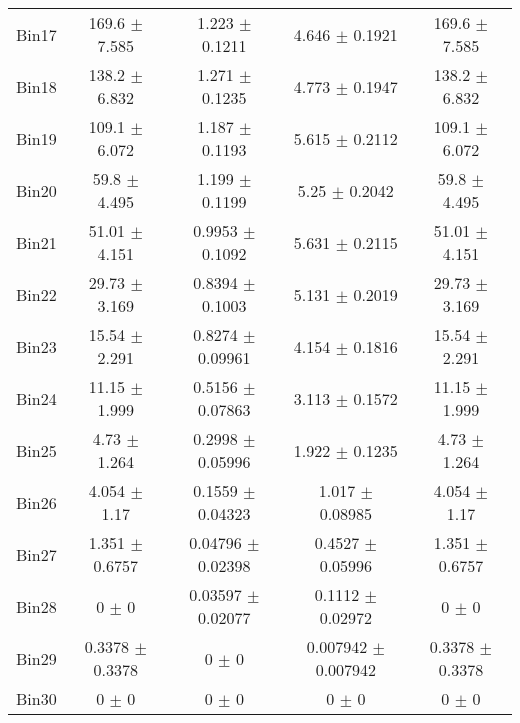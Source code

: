 \begin{tabular}{@{\extracolsep{4pt}}lcccc@{}}
     Bin17 & 169.6 $\pm$ 7.585 & 1.223 $\pm$ 0.1211 & 4.646 $\pm$ 0.1921 & 169.6 $\pm$ 7.585 \\ 
     Bin18 & 138.2 $\pm$ 6.832 & 1.271 $\pm$ 0.1235 & 4.773 $\pm$ 0.1947 & 138.2 $\pm$ 6.832 \\ 
     Bin19 & 109.1 $\pm$ 6.072 & 1.187 $\pm$ 0.1193 & 5.615 $\pm$ 0.2112 & 109.1 $\pm$ 6.072 \\ 
     Bin20 & 59.8 $\pm$ 4.495 & 1.199 $\pm$ 0.1199 & 5.25 $\pm$ 0.2042 & 59.8 $\pm$ 4.495 \\ 
     Bin21 & 51.01 $\pm$ 4.151 & 0.9953 $\pm$ 0.1092 & 5.631 $\pm$ 0.2115 & 51.01 $\pm$ 4.151 \\ 
     Bin22 & 29.73 $\pm$ 3.169 & 0.8394 $\pm$ 0.1003 & 5.131 $\pm$ 0.2019 & 29.73 $\pm$ 3.169 \\ 
     Bin23 & 15.54 $\pm$ 2.291 & 0.8274 $\pm$ 0.09961 & 4.154 $\pm$ 0.1816 & 15.54 $\pm$ 2.291 \\ 
     Bin24 & 11.15 $\pm$ 1.999 & 0.5156 $\pm$ 0.07863 & 3.113 $\pm$ 0.1572 & 11.15 $\pm$ 1.999 \\ 
     Bin25 & 4.73 $\pm$ 1.264 & 0.2998 $\pm$ 0.05996 & 1.922 $\pm$ 0.1235 & 4.73 $\pm$ 1.264 \\ 
     Bin26 & 4.054 $\pm$ 1.17 & 0.1559 $\pm$ 0.04323 & 1.017 $\pm$ 0.08985 & 4.054 $\pm$ 1.17 \\ 
     Bin27 & 1.351 $\pm$ 0.6757 & 0.04796 $\pm$ 0.02398 & 0.4527 $\pm$ 0.05996 & 1.351 $\pm$ 0.6757 \\ 
     Bin28 & 0 $\pm$ 0 & 0.03597 $\pm$ 0.02077 & 0.1112 $\pm$ 0.02972 & 0 $\pm$ 0 \\ 
     Bin29 & 0.3378 $\pm$ 0.3378 & 0 $\pm$ 0 & 0.007942 $\pm$ 0.007942 & 0.3378 $\pm$ 0.3378 \\ 
     Bin30 & 0 $\pm$ 0 & 0 $\pm$ 0 & 0 $\pm$ 0 & 0 $\pm$ 0 \\ 
\hline\hline
  \end{tabular}
